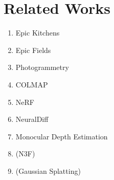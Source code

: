 \chapter{Related Works}
\label{sec:Related}

\begin{enumerate}
    \item Epic Kitchens
    \item Epic Fields
    \item Photogrammetry
    \item COLMAP
    \item NeRF
    \item NeuralDiff
    \item Monocular Depth Estimation
    \item (N3F)
    \item (Gaussian Splatting)
\end{enumerate}


